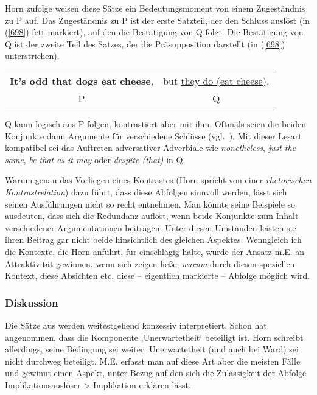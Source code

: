 Horn zufolge weisen diese Sätze ein Bedeutungsmoment von einem Zugeständnis zu P auf. Das Zugeständnis zu P ist der erste Satzteil, der den Schluss auslöst (in (\ref{698}) fett markiert), auf den die Bestätigung von Q folgt. Die Bestätigung von Q ist der zweite Teil des Satzes, der die Präsupposition darstellt (in (\ref{698}) unterstrichen).
\begin{exe}
	\ex\label{698} 
	\begin{tabular}[t]{cc}
	\textbf{It's odd that dogs eat cheese}, & but \ul{they do (eat cheese)}.\\
	P & Q
    \end{tabular}
\end{exe}
Q kann logisch aus P folgen, kontrastiert aber mit ihm. Oftmals seien die beiden Konjunkte dann Argumente für verschiedene Schlüsse (vgl.\ \citeyear[325]{Horn1991}). Mit dieser Lesart kompatibel sei das Auftreten adversativer Adverbiale wie \textit{nonetheless}, \textit{just the same}, \textit{be that as it may} oder \textit{despite (that)} in Q.

Warum genau das Vorliegen eines Kontrastes (Horn spricht von einer \textit{rhetori\-schen Kontrastrelation})  dazu führt, dass diese Abfolgen sinnvoll werden, lässt sich seinen Ausführungen nicht so recht entnehmen. Man könnte seine Beispiele so ausdeuten, dass sich die Redundanz auflöst, wenn beide Konjunkte zum Inhalt verschiedener Argumentationen beitragen. Unter diesen Umständen leisten sie ihren Beitrag gar nicht beide hinsichtlich des gleichen Aspektes. Wenngleich ich die Kontexte, die Horn anführt, für einschlägig halte, würde der Ansatz m.E. an Attraktivität gewinnen, wenn sich zeigen ließe, \emph{warum} durch diesen speziellen Kontext, diese Absichten etc. diese – eigentlich markierte – Abfolge möglich wird.

\subsubsection{Diskussion}
\label{sec:disk}
Die Sätze aus \citet{Horn1991} werden weitestgehend konzessiv interpretiert. Schon \citet[227--232]{Ward1985} hat angenommen, dass die Komponente ‚Unerwartet\-heit‘ beteiligt ist. Horn schreibt allerdings, seine Bedingung sei weiter; Unerwartet\-heit (und auch   bei Ward) sei nicht durchweg beteiligt. M.E. erfasst man auf diese Art aber die meisten Fälle und gewinnt einen Aspekt, unter Bezug auf den sich die Zulässigkeit der Abfolge Implikationsauslöser > Implikation er\-klären lässt.


